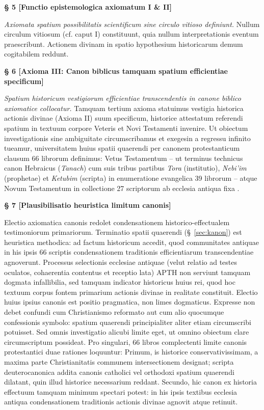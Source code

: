 \documentclass[11pt,a4paper]{article}
\makeatletter
\newcommand{\apth}{{\apthfont APTH}\hspace{0.15em}\xspace}
\newcommand{\apthsec}[3]{%
  \phantomsection%
  \def\@currentlabel{#1}%
  \label{sec:#3}%
  \textbf{§ #1 [#2]}%
}
\makeatother
\begin{document}
\apthsec{5}{Functio epistemologica axiomatum I \& II}{axiom-funktion}
\textit{Axiomata spatium possibilitatis scientificum sine circulo vitioso definiunt.}
Nullum circulum vitiosum (cf. caput I) constituunt, quia nullum interpretationis eventum praescribunt. Actionem divinam in spatio hypothesium historicarum demum cogitabilem reddunt.

\apthsec{6}{Axioma III: Canon biblicus tamquam spatium efficientiae specificum}{kanon}
\textit{Spatium historicum vestigiorum efficientiae transcendentis in canone biblico axiomatice collocatur.}
Tamquam tertium axioma statuimus vestigia historica actionis divinae (Axioma II) suum specificum, historice attestatum referendi spatium in textuum corpore Veteris et Novi Testamenti invenire. Ut obiectum investigationis sine ambiguitate circumscribamus et exegesin a regressu infinito tueamur, universitatem huius spatii quaerendi per canonem protestanticum clausum 66 librorum definimus: Vetus Testamentum -- ut terminus technicus canon Hebraicus (\textit{Tanach}) cum suis tribus partibus \textit{Tora} (institutio), \textit{Nebi'im} (prophetae) et \textit{Ketubim} (scripta) in enumeratione evangelica 39 librorum -- atque Novum Testamentum in collectione 27 scriptorum ab ecclesia antiqua fixa \citep{beckwith1985,metzger1987}.

\apthsec{7}{Plausibilisatio heuristica limitum canonis}{kanon-heuristik}
Electio axiomatica canonis redolet condensationem historico-effectualem testimoniorum primariorum. Terminatio spatii quaerendi (§~\ref{sec:kanon}) est heuristica methodica: ad factum historicum accedit, quod communitates antiquae in his ipsis 66 scriptis condensationem traditionis efficientiarum transcendentiae agnoverunt. Processus selectionis ecclesiae antiquae (velut relatio ad testes oculatos, cohaerentia contentus et receptio lata) \apth non serviunt tamquam dogmata infallibilia, sed tamquam indicator historicus huius rei, quod hoc textuum corpus fontem primarium actionis divinae in realitate constituit. Electio huius ipsius canonis est positio pragmatica, non limes dogmaticus. Expresse non debet confundi cum Christianismo reformato aut cum alio quocumque confessionis symbolo: spatium quaerendi principialiter aliter etiam circumscribi potuisset. Sed omnis investigatio alicubi limite eget, ut omnino obiectum clare circumscriptum possideat. Pro singulari, 66 libros complectenti limite canonis protestantici duae rationes loquuntur: Primum, is historice conservativissimam, a maxima parte Christianitatis communem intersectionem designat; scripta deuterocanonica addita canonis catholici vel orthodoxi spatium quaerendi dilatant, quin illud historice necessarium reddant. Secundo, hic canon ex historia effectuum tamquam minimum spectari potest: in his ipsis textibus ecclesia antiqua condensationem traditionis actionis divinae agnovit atque retinuit.
\end{document}
